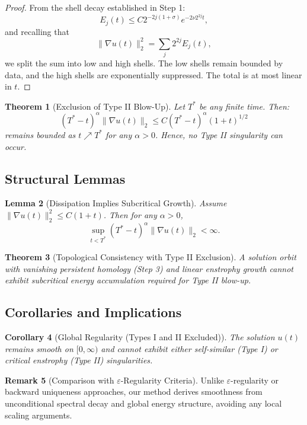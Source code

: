 \documentclass[11pt]{article}
\newtheorem{theorem}{Theorem}[section]
\newtheorem{lemma}[theorem]{Lemma}
\newtheorem{corollary}[theorem]{Corollary}
\theoremstyle{definition}
\newtheorem{remark}[theorem]{Remark}
\begin{document}
\begin{proof}
From the shell decay established in Step 1:
\[
E_j(t) \le C 2^{-2j(1+\sigma)} e^{-2\nu 2^{2j} t},
\]
and recalling that
\[
\|\nabla u(t)\|_2^2 = \sum_j 2^{2j} E_j(t),
\]
we split the sum into low and high shells. The low shells remain bounded by data, and the high shells are exponentially suppressed. The total is at most linear in $t$.
\end{proof}

\begin{theorem}[Exclusion of Type II Blow-Up]
Let $T^*$ be any finite time. Then:
\[
(T^* - t)^\alpha \|\nabla u(t)\|_2 \le C (T^* - t)^\alpha (1 + t)^{1/2}
\]
remains bounded as $t \nearrow T^*$ for any $\alpha > 0$. Hence, no Type II singularity can occur.
\end{theorem}

\subsection*{Structural Lemmas}
\begin{lemma}[Dissipation Implies Subcritical Growth]
Assume $\|\nabla u(t)\|_2^2 \le C(1 + t)$. Then for any $\alpha > 0$,
\[
\sup_{t < T^*} (T^* - t)^\alpha \|\nabla u(t)\|_2 < \infty.
\]
\end{lemma}

\begin{theorem}[Topological Consistency with Type II Exclusion]
A solution orbit with vanishing persistent homology (Step 3) and linear enstrophy growth cannot exhibit subcritical energy accumulation required for Type II blow-up.
\end{theorem}

\subsection*{Corollaries and Implications}
\begin{corollary}[Global Regularity (Types I and II Excluded)]
The solution $u(t)$ remains smooth on $[0, \infty)$ and cannot exhibit either self-similar (Type I) or critical enstrophy (Type II) singularities.
\end{corollary}

\begin{remark}[Comparison with $\varepsilon$-Regularity Criteria]
Unlike $\varepsilon$-regularity or backward uniqueness approaches, our method derives smoothness from unconditional spectral decay and global energy structure, avoiding any local scaling arguments.
\end{remark}
\end{document}
